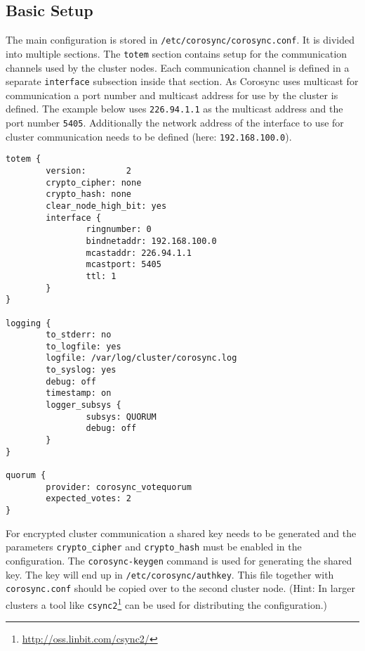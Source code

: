 \documentclass[a4paper,11pt,DIV=12]{scrartcl}
\begin{document}
\subsection{Basic Setup}
    The main  configuration is stored in \verb|/etc/corosync/corosync.conf|.
    It is divided into multiple sections. The \verb|totem| section contains
    setup for the communication channels used by the cluster nodes.  Each
    communication channel is defined in a separate \verb|interface| subsection
    inside that section. As Corosync uses multicast for communication a
    port number and multicast address for use by the cluster is defined. The
    example below uses \verb|226.94.1.1| as the multicast address and the port
    number \verb|5405|.  Additionally the network address of the interface to
    use for cluster communication needs to be defined
    (here: \verb|192.168.100.0|).
    \begin{verbatim}
totem {
        version:        2
        crypto_cipher: none
        crypto_hash: none
        clear_node_high_bit: yes
        interface {
                ringnumber: 0
                bindnetaddr: 192.168.100.0
                mcastaddr: 226.94.1.1
                mcastport: 5405
                ttl: 1
        }
}

logging {
        to_stderr: no
        to_logfile: yes
        logfile: /var/log/cluster/corosync.log
        to_syslog: yes
        debug: off
        timestamp: on
        logger_subsys {
                subsys: QUORUM
                debug: off
        }
}

quorum {
        provider: corosync_votequorum
        expected_votes: 2
}

    \end{verbatim}


    For encrypted cluster communication a shared key needs to be generated 
    and the parameters \verb|crypto_cipher| and \verb|crypto_hash| must be
    enabled in the configuration.
    The \verb|corosync-keygen| command is used for generating the shared key.
    The key will end up in \verb|/etc/corosync/authkey|. This file together with
    \verb|corosync.conf| should be copied over to the second cluster node.
    (Hint: In larger clusters a tool like
    \verb|csync2|\footnote{\url{http://oss.linbit.com/csync2/}} can be used
    for distributing the configuration.)
\end{document}
